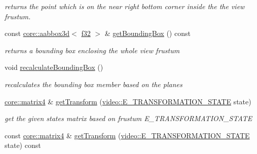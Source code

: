 \begin{DoxyCompactItemize}
\begin{DoxyCompactList}\small\item\em returns the point which is on the near right bottom corner inside the the view frustum. \end{DoxyCompactList}\item 
\mbox{\label{structirr_1_1scene_1_1SViewFrustum_a1b7fd2736250d34ff399bc17d66867c0}} 
const \hyperlink{classirr_1_1core_1_1aabbox3d}{core\+::aabbox3d}$<$ \hyperlink{namespaceirr_a0277be98d67dc26ff93b1a6a1d086b07}{f32} $>$ \& \hyperlink{structirr_1_1scene_1_1SViewFrustum_a1b7fd2736250d34ff399bc17d66867c0}{get\+Bounding\+Box} () const
\begin{DoxyCompactList}\small\item\em returns a bounding box enclosing the whole view frustum \end{DoxyCompactList}\item 
\mbox{\label{structirr_1_1scene_1_1SViewFrustum_a458eb19a23bcad50da0f9d3163e3621b}} 
void \hyperlink{structirr_1_1scene_1_1SViewFrustum_a458eb19a23bcad50da0f9d3163e3621b}{recalculate\+Bounding\+Box} ()
\begin{DoxyCompactList}\small\item\em recalculates the bounding box member based on the planes \end{DoxyCompactList}\item 
\hyperlink{namespaceirr_1_1core_a73fa92e638c5ca97efd72da307cc9b65}{core\+::matrix4} \& \hyperlink{structirr_1_1scene_1_1SViewFrustum_acf8edd203e7479d2b444ed548075ffa6}{get\+Transform} (\hyperlink{namespaceirr_1_1video_a15b57657a320243be03ae6f66fcff43d}{video\+::\+E\+\_\+\+T\+R\+A\+N\+S\+F\+O\+R\+M\+A\+T\+I\+O\+N\+\_\+\+S\+T\+A\+TE} state)
\begin{DoxyCompactList}\small\item\em get the given state\textquotesingle{}s matrix based on frustum E\+\_\+\+T\+R\+A\+N\+S\+F\+O\+R\+M\+A\+T\+I\+O\+N\+\_\+\+S\+T\+A\+TE \end{DoxyCompactList}\item 
const \hyperlink{namespaceirr_1_1core_a73fa92e638c5ca97efd72da307cc9b65}{core\+::matrix4} \& \hyperlink{structirr_1_1scene_1_1SViewFrustum_a9afbd4a90f330de3fde6b534da3920f8}{get\+Transform} (\hyperlink{namespaceirr_1_1video_a15b57657a320243be03ae6f66fcff43d}{video\+::\+E\+\_\+\+T\+R\+A\+N\+S\+F\+O\+R\+M\+A\+T\+I\+O\+N\+\_\+\+S\+T\+A\+TE} state) const

\end{DoxyCompactItemize}
